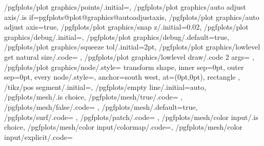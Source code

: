 {	%
	/pgfplots/plot graphics/points/.initial=,
	/pgfplots/plot graphics/auto adjust axis/.is if=pgfplots@plot@graphics@autoadjustaxis,
	/pgfplots/plot graphics/auto adjust axis=true,
	/pgfplots/plot graphics/snap z/.initial=0.02,
	/pgfplots/plot graphics/debug/.initial=,
	/pgfplots/plot graphics/debug/.default=true,
	/pgfplots/plot graphics/squeeze tol/.initial=2pt,
	/pgfplots/plot graphics/lowlevel get natural size/.code={%
		\pgfplots@plot@handler@graphics@getnaturalsize
	},
	/pgfplots/plot graphics/lowlevel draw/.code 2 args={%
	},%
	/pgfplots/plot graphics/node/.style={
		transform shape,
		inner sep=0pt,
		outer sep=0pt,
		every node/.style={},
		anchor=south west,
		at={(0pt,0pt)},
		rectangle
	},
	/tikz/pos segment/.initial=,
	/pgfplots/empty line/.initial=auto,
	/pgfplots/mesh/.is choice,
	/pgfplots/mesh/true/.code={%
		\def\pgfplots@meshmode{m}%
		\let\tikz@plot@handler=\pgfplotsplothandlermesh
		\pgfplots@perpointmeta@expandtrue
	},
	/pgfplots/mesh/false/.code={
		\def\pgfplots@meshmode{n}%
		\ifx\tikz@plot@handler\pgfplotsplothandlermesh
			\let\tikz@plot@handler=\pgfplothandlerlineto
		\fi},
	/pgfplots/mesh/.default=true,
	/pgfplots/surf/.code={%
		\def\pgfplots@meshmode{s}%
	},%
	/pgfplots/patch/.code={%
	},%
	/pgfplots/mesh/color input/.is choice,
	/pgfplots/mesh/color input/colormap/.code=\def\pgfplotsplothandlermesh@colorinput{0},%
	/pgfplots/mesh/color input/explicit/.code={%
		\def\pgfplotsplothandlermesh@colorinput{1}%
		\def\pgfplotsplothandlermesh@colorinput@mathparse{0}%
}}
